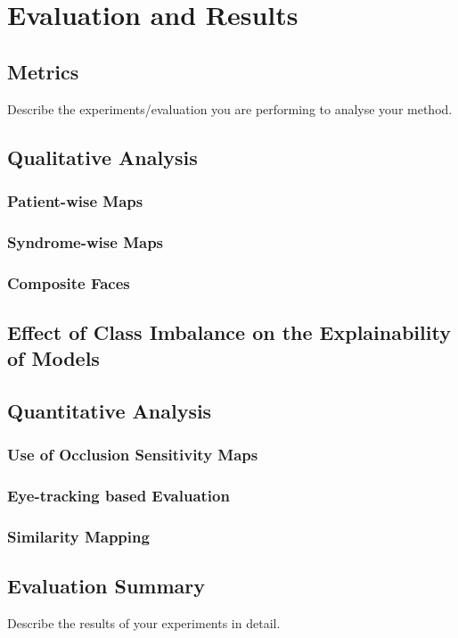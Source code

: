\documentclass[../report.tex]{subfiles}
\begin{document}
    \chapter{Evaluation and Results}

    \section{Metrics}

    Describe the experiments/evaluation you are performing to analyse your method.

    \section{Qualitative Analysis}
    
    \subsection{Patient-wise Maps}
    
    \subsection{Syndrome-wise Maps}
    
    \subsection{Composite Faces}
    
    \section{Effect of Class Imbalance on the Explainability of Models}

    \section{Quantitative Analysis}
    \subsection{Use of Occlusion Sensitivity Maps}
    \subsection{Eye-tracking based Evaluation}
    \subsection{Similarity Mapping}



    \section{Evaluation Summary}

    Describe the results of your experiments in detail.
\end{document}

